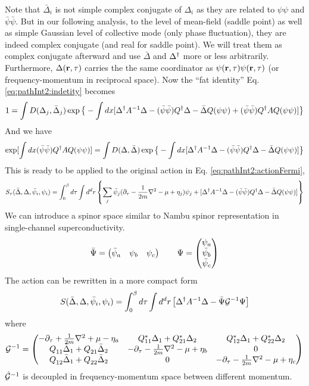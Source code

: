 Note that  $\bar{\Delta}_{i}$ is not simple complex conjugate of $\Delta_{i}$ as they are related to $\psi\psi$ and $\bar\psi\bar\psi$. But in our following analysis, to the level of mean-field (saddle point) as well as simple Gaussian level of collective mode (only phase fluctuation), they are indeed complex conjugate (and real for saddle point).  We will treat them as complex conjugate afterward and use $\bar\Delta$ and $\Delta^{\dagger}$ more or less arbitrarily.  Furthermore, $\Delta(\mathbf{r},\tau)$ carries the the same coordinator as $\psi(\mathbf{r},\tau)\psi(\mathbf{r},\tau)$ (or frequency-momentum in reciprocal space).  Now the ``fat identity'' Eq. \ref{eq:pathInt2:indetity} becomes 
\begin{equation}
1=\int{D(\Delta_{j},\bar\Delta_{j})}\exp\big\{-\int{dx}
	[\Delta^{\dagger}A^{-1}\Delta-(\bar\psi\bar\psi)Q^{\dagger}\Delta-\bar\Delta{Q}(\psi\psi)+(\bar\psi\bar\psi)Q^{\dagger}AQ(\psi\psi)]\big\}
\end{equation}
And we have 
\begin{equation}
\exp[\int{dx}(\bar\psi\bar\psi)Q^{\dagger}AQ(\psi\psi)]
=\int{D(\Delta,\bar\Delta)}\exp\big\{-\int{dx}
	[\Delta^{\dagger}A^{-1}\Delta-(\bar\psi\bar\psi)Q^{\dagger}\Delta-\bar\Delta{Q}(\psi\psi)]\big\}
\end{equation}
This is ready to be applied to the original action in Eq. \ref{eq:pathInt2:actionFermi}, 
\begin{equation}\label{eq:pathInt2:actionMix}
S_{\tau}(\bar\Delta,\Delta,\bar\psi_{i},\psi_{i})=\int^{\beta}_{0}d\tau\int{d^{d}r}\left\{\sum_{j}\bar\psi_{j}(\partial_\tau-\frac{1}{2m}\nabla^{2}-\mu+\eta_{j})\psi_{j}
+[\Delta^{\dagger}A^{-1}\Delta-(\bar\psi\bar\psi)Q^{\dagger}\Delta-\bar\Delta{Q}(\psi\psi)]\right\}
\end{equation}
We can introduce a spinor space similar to Nambu spinor representation in single-channel superconductivity.  
\begin{equation}
\bar\Psi=\begin{pmatrix}\bar\psi_{a}&\psi_{b}&\psi_{c}\end{pmatrix}\qquad\Psi=\begin{pmatrix}\psi_{a}\\\bar\psi_{b}\\\bar\psi_{c}\end{pmatrix}
\end{equation}
The action can be rewritten in a more compact form
\begin{equation}\label{eq:pathInt2:actionMixCompact}
S(\bar\Delta,\Delta,\bar\psi_{i},\psi_{i})=\int^{\beta}_{0}d\tau\int{d^{d}r}
	\left[\Delta^{\dagger}A^{-1}\Delta-\bar\Psi\mathcal{G}^{-1}\Psi\right]
\end{equation}
where 
\begin{equation}
\mathcal{G}^{-1}=
\begin{pmatrix}\label{eq:pathInt2:nGDelta}
-\partial_{\tau}+\frac{1}{2m}\nabla^{2}+\mu-\eta_{a}&Q^{*}_{11}\Delta_{1}+Q^{*}_{21}\Delta_{2}&Q^{*}_{12}\Delta_{1}+Q^{*}_{22}\Delta_{2}\\
Q^{}_{11}\bar\Delta_{1}+Q^{}_{21}\bar\Delta_{2}&-\partial_{\tau}-\frac{1}{2m}\nabla^{2}-\mu+\eta_{b}&0\\
Q^{}_{12}\bar\Delta_{1}+Q^{}_{22}\bar\Delta_{2}&0&-\partial_{\tau}-\frac{1}{2m}\nabla^{2}-\mu+\eta_{c}
\end{pmatrix}
\end{equation}
$\hat{\mathcal{G}}^{-1}$ is decoupled in frequency-momentum space between different momentum. 

